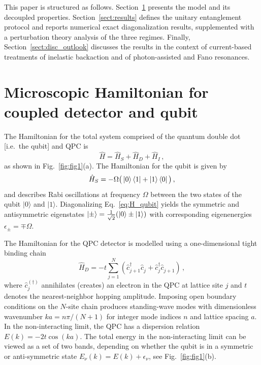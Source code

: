 \documentclass[10pt,
 amsmath,amssymb,
 aps,prb, twocolumn
]{revtex4-2}
\begin{document}
This paper is structured as follows. Section~\ref{sect:model} presents the model and its decoupled properties. Section~\ref{sect:results} defines the unitary entanglement protocol and reports numerical exact diagonalization results, supplemented with a perturbation theory analysis of the three regimes. Finally, Section~\ref{sect:disc_outlook} discusses the results in the context of current-based treatments of inelastic backaction and of photon-assisted and Fano resonances.

\section{Microscopic Hamiltonian for coupled detector and qubit}\label{sect:model}

The Hamiltonian for the total system comprised of the quantum double dot [i.e.\ the qubit] and QPC is
\begin{equation}\label{eq:qpc_dd_H}
    \hat{H} = \hat{H}_S + \hat{H}_D + \hat{H}_I \,,
\end{equation}
as shown in Fig.~\ref{fig:fig1}(a). The Hamiltonian for the qubit is given by
\begin{equation}\label{eq:H_qubit}
    \hat{H}_S = -\Omega \big(\ket{0}\bra{1} + \ket{1}\bra{0}\big) \,,
\end{equation}
and describes Rabi oscillations at frequency $\Omega$ between the two states of the qubit $|0\rangle$ and $|1\rangle$.
Diagonalizing Eq.~\eqref{eq:H_qubit} yields the symmetric and antisymmetric eigenstates \mbox{$|\pm\rangle = \frac{1}{\sqrt{2}}(\ket{0}\pm\ket{1})$} with corresponding eigenenergies $\epsilon_\pm = \mp \Omega$.

The Hamiltonian for the QPC detector is modelled using a one-dimensional tight binding chain
\begin{equation}\label{eq:H_detector}
    \hat{H}_D = -t \sum_{j=1}^N\left( \hat{c}^{\dagger}_{j+1}\hat{c}^{\phantom{\dagger}}_{j} + \hat{c}^{\dagger}_{j}\hat{c}^{\phantom{\dagger}}_{j+1} \right) \,,
\end{equation}
where \mbox{$\hat{c}_j^{(\dagger)}$} annihilates (creates) an electron in the QPC at lattice site 
\mbox{$j$} and 
\mbox{$t$} denotes the nearest-neighbor hopping amplitude. Imposing open boundary conditions on the \mbox{$N$}-site chain produces standing-wave modes with dimensionless wavenumber \mbox{$ka = n\pi/(N+1)$} for integer mode indices \mbox{$n$} and lattice spacing \mbox{$a$}.
In the non-interacting limit, the QPC has a dispersion relation $E(k) = - 2 t \cos(ka)$.
The total energy in the non-interacting limit can be viewed as a set of two bands, depending on whether the qubit is in a symmetric or anti-symmetric state \mbox{$E_\nu(k) = E(k)+\epsilon_\nu$}, see Fig.~\ref{fig:fig1}(b).
\end{document}

